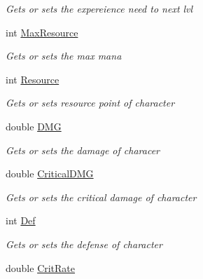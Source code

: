 \begin{DoxyCompactItemize}
\begin{DoxyCompactList}\small\item\em Gets or sets the expereience need to next lvl \end{DoxyCompactList}\item 
int \hyperlink{class_lightdeath_1_1_character__classes_acdb8976da184c7f6e2883b8a3f53b750}{Max\+Resource}
\begin{DoxyCompactList}\small\item\em Gets or sets the max mana \end{DoxyCompactList}\item 
int \hyperlink{class_lightdeath_1_1_character__classes_a146137183b0215163ac6605df6613c7c}{Resource}
\begin{DoxyCompactList}\small\item\em Gets or sets resource point of character \end{DoxyCompactList}\item 
double \hyperlink{class_lightdeath_1_1_character__classes_addda735b67d96c7cb2109938a710aac1}{D\+MG}
\begin{DoxyCompactList}\small\item\em Gets or sets the damage of characer \end{DoxyCompactList}\item 
double \hyperlink{class_lightdeath_1_1_character__classes_ac2eef720ee351703068b3eebae4c1b67}{Critical\+D\+MG}
\begin{DoxyCompactList}\small\item\em Gets or sets the critical damage of character \end{DoxyCompactList}\item 
int \hyperlink{class_lightdeath_1_1_character__classes_a3ee38ddaad13fe78a38774e841053be0}{Def}
\begin{DoxyCompactList}\small\item\em Gets or sets the defense of character \end{DoxyCompactList}\item 
double \hyperlink{class_lightdeath_1_1_character__classes_af9bda19058c993e15be0f0aab18d6a45}{Crit\+Rate}

\end{DoxyCompactItemize}

